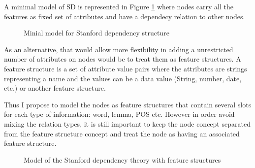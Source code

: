 \documentclass[11pt,a4paper,titlepage]{article}
\begin{document}
A minimal model of SD is represented in Figure \ref{fig:mode-dep-min} where nodes carry all the features as fixed set of attributes and have a dependecy relation to other nodes.

\begin{figure}[H]
	\centering
	\label{fig:mode-dep-min}
	\caption{Minial model for Stanford dependency structure}
\end{figure}

As an alternative, that would allow more flexibility in adding a unrestricted number of attributes on nodes would be to treat them as feature structures. A feature structure is a set of attribute value pairs where the attributes are strings representing a name and the values can be a data value (String, number, date, etc.) or another feature structure. 

Thus I propose to model the nodes as feature structures that contain several slots for each type of information: word, lemma, POS etc. However in order avoid mixing the relation types, it is still important to keep the node concept separated from the feature structure concept and treat the node as having an associated feature structure.

\begin{figure}[H]
	\centering
	\label{fig:mode-dep}
	\caption{Model of the Stanford dependency theory with feature structures}
\end{figure}
\end{document}
